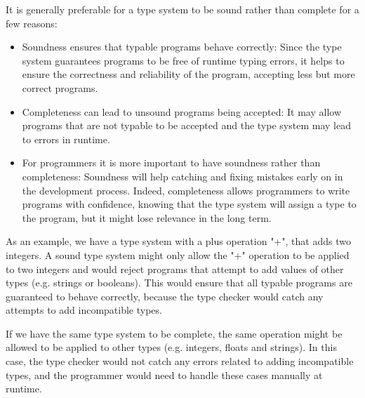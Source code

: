 \documentclass[a4paper]{article}
\begin{document}
\begin{enumerate}
  It is generally preferable for a type system to be sound rather than complete for a few reasons:
  \begin{itemize}
    \item Soundness ensures that typable programs behave correctly: Since the type system guarantees programs to be free of runtime typing errors, it helps to ensure the correctness and reliability of the program, accepting less but more correct programs.
    \item Completeness can lead to unsound programs being accepted: It may allow programs that are not typable to be accepted and the type system may lead to errors in runtime.
    \item For programmers it is more important to have soundness rather than completeness: Soundness will help catching and fixing mistakes early on in the development process. Indeed, completeness allows programmers to write programs with confidence, knowing that the type system will assign a type to the program, but it might lose relevance in the long term. 
  \end{itemize}

  As an example, we have a type system with a plus operation "+", that adds two integers. A sound type system might only allow the "+" operation to be applied to two integers and would reject programs that attempt to add values of other types (e.g. strings or booleans). This would ensure that all typable programs are guaranteed to behave correctly, because the type checker would catch any attempts to add incompatible types.

  If we have the same type system to be complete, the same operation might be allowed to be applied to other types (e.g. integers, floats and strings). In this case, the type checker would not catch any errors related to adding incompatible types, and the programmer would need to handle these cases manually at runtime.
\end{enumerate}
\end{document}
